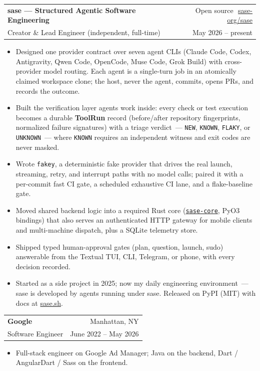 \documentclass[letterpaper,10pt]{article}
\makeatletter
\newcommand{\midsep}{\,\textcolor{dbxline}{\textbullet}\,}
\newcommand{\ressubheading}[4]{%
  \par\addvspace{2pt}%
  \noindent
  \begin{tabular*}{\textwidth}{@{}l@{\extracolsep{\fill}}r@{}}
    {\bfseries\color{dbxink}\fontsize{10.4pt}{12.4pt}\selectfont #1} &
    {\color{dbxslate}\fontsize{9.2pt}{11pt}\selectfont #2} \\[0.5pt]
    {\color{dbxdeep}\fontsize{9.9pt}{11.7pt}\selectfont #3} &
    {\color{dbxslate}\fontsize{8.8pt}{10.5pt}\selectfont #4}
  \end{tabular*}\par\vspace{-3pt}
}
\makeatother
\begin{document}
\ressubheading{sase --- Structured Agentic Software Engineering}{Open source \midsep \href{https://github.com/sase-org/sase}{sase-org/sase}}{Creator \& Lead Engineer (independent, full-time)}{May 2026 -- present}
\begin{itemize}
  \item Designed one provider contract over seven agent CLIs (Claude Code, Codex, Antigravity, Qwen Code, OpenCode, Muse Code, Grok Build) with cross-provider model routing. Each agent is a single-turn job in an atomically claimed workspace clone; the host, never the agent, commits, opens PRs, and records the outcome.
  \item Built the verification layer agents work inside: every check or test execution becomes a durable \textbf{ToolRun} record (before/after repository fingerprints, normalized failure signatures) with a triage verdict~--- \texttt{NEW}, \texttt{KNOWN}, \texttt{FLAKY}, or \texttt{UNKNOWN}~--- where \texttt{KNOWN} requires an independent witness and exit codes are never masked.
  \item Wrote \texttt{fakey}, a deterministic fake provider that drives the real launch, streaming, retry, and interrupt paths with no model calls; paired it with a per-commit fast CI gate, a scheduled exhaustive CI lane, and a flake-baseline gate.
  \item Moved shared backend logic into a required Rust core (\href{https://github.com/sase-org/sase-core}{\texttt{sase-core}}, PyO3 bindings) that also serves an authenticated HTTP gateway for mobile clients and multi-machine dispatch, plus a SQLite telemetry store.
  \item Shipped typed human-approval gates (plan, question, launch, sudo) answerable from the Textual TUI, CLI, Telegram, or phone, with every decision recorded.
  \item Started as a side project in 2025; now my daily engineering environment~--- sase is developed by agents running under sase. Released on PyPI (MIT) with docs at \href{https://sase.sh}{sase.sh}.
\end{itemize}

\ressubheading{Google}{Manhattan, NY}{Software Engineer}{June 2022 -- May 2026}
\begin{itemize}
  \item Full-stack engineer on Google Ad Manager; Java on the backend, Dart / AngularDart / Sass on the frontend.
\end{itemize}
\end{document}
